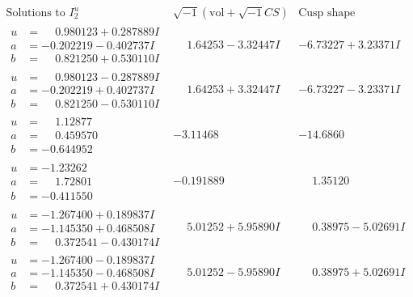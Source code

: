 \documentclass[1p]{elsarticle_modified}
\theoremstyle{definition}
\newcommand{\I}{\sqrt{-1}}
\begin{document}
$$\begin{array}{c|c|c}  
\text{Solutions to }I^u_{2}& \I (\text{vol} + \sqrt{-1}CS) & \text{Cusp shape}\\
 \hline 
\begin{aligned}
u &= \phantom{-}0.980123 + 0.287889 I \\
a &= -0.202219 - 0.402737 I \\
b &= \phantom{-}0.821250 + 0.530110 I\end{aligned}
 & \phantom{-}1.64253 - 3.32447 I & -6.73227 + 3.23371 I \\ \hline\begin{aligned}
u &= \phantom{-}0.980123 - 0.287889 I \\
a &= -0.202219 + 0.402737 I \\
b &= \phantom{-}0.821250 - 0.530110 I\end{aligned}
 & \phantom{-}1.64253 + 3.32447 I & -6.73227 - 3.23371 I \\ \hline\begin{aligned}
u &= \phantom{-}1.12877\phantom{ +0.000000I} \\
a &= \phantom{-}0.459570\phantom{ +0.000000I} \\
b &= -0.644952\phantom{ +0.000000I}\end{aligned}
 & -3.11468\phantom{ +0.000000I} & -14.6860\phantom{ +0.000000I} \\ \hline\begin{aligned}
u &= -1.23262\phantom{ +0.000000I} \\
a &= \phantom{-}1.72801\phantom{ +0.000000I} \\
b &= -0.411550\phantom{ +0.000000I}\end{aligned}
 & -0.191889\phantom{ +0.000000I} & \phantom{-}1.35120\phantom{ +0.000000I} \\ \hline\begin{aligned}
u &= -1.267400 + 0.189837 I \\
a &= -1.145350 + 0.468508 I \\
b &= \phantom{-}0.372541 - 0.430174 I\end{aligned}
 & \phantom{-}5.01252 + 5.95890 I & \phantom{-}0.38975 - 5.02691 I \\ \hline\begin{aligned}
u &= -1.267400 - 0.189837 I \\
a &= -1.145350 - 0.468508 I \\
b &= \phantom{-}0.372541 + 0.430174 I\end{aligned}
 & \phantom{-}5.01252 - 5.95890 I & \phantom{-}0.38975 + 5.02691 I \\ \hline\begin{aligned}

\end{aligned}
\end{array}$$
\end{document}
